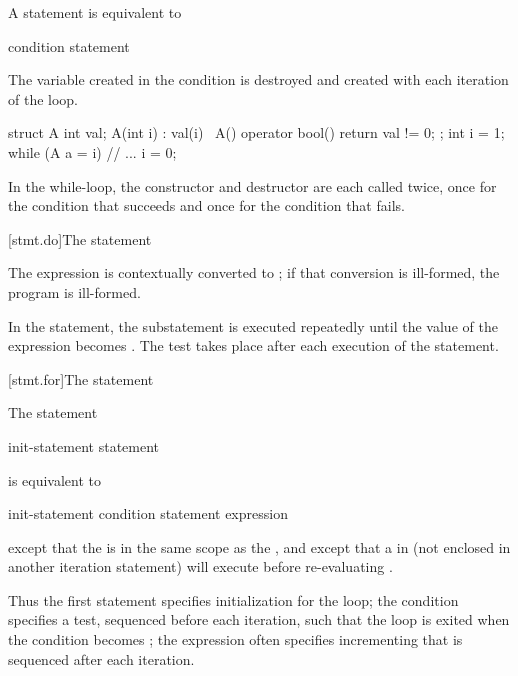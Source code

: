 \pnum
{}%
A  statement is equivalent to
\begin{ncsimplebnf}
 \terminal{:}\br
\terminal{\{}\br
\bnfindent {} \terminal{(} condition \terminal{)} \terminal{\{}\br
\bnfindent \bnfindent statement\br
\bnfindent \bnfindent {}  \terminal{;}\br
\bnfindent \terminal{\}}\br
\terminal{\}}
\end{ncsimplebnf}
\begin{note}
The variable created in the condition is destroyed and created with each
iteration of the loop.
\begin{example}
\begin{codeblock}
struct A {
  int val;
  A(int i) : val(i) { }
  ~A() { }
  operator bool() { return val != 0; }
};
int i = 1;
while (A a = i) {
  // ...
  i = 0;
}
\end{codeblock}
In the while-loop, the constructor and destructor are each called twice,
once for the condition that succeeds and once for the condition that
fails.
\end{example}
\end{note}

[stmt.do]{The  statement}%

\pnum
The expression is contextually converted to ;
if that conversion is ill-formed, the program is ill-formed.

\pnum
In the  statement, the substatement is executed repeatedly
until the value of the expression becomes . The test takes
place after each execution of the statement.

[stmt.for]{The  statement}%

\pnum
The  statement
\begin{ncsimplebnf}
 \terminal{(} init-statement  \terminal{;}  \terminal{)} statement
\end{ncsimplebnf}
is equivalent to
\begin{ncsimplebnf}
\terminal{\{}\br
\bnfindent init-statement\br
\bnfindent {} \terminal{(} condition \terminal{)} \terminal{\{}\br
\bnfindent\bnfindent statement\br
\bnfindent\bnfindent expression \terminal{;}\br
\bnfindent \terminal{\}}\br
\terminal{\}}
\end{ncsimplebnf}
except that the  is
in the same scope as the , and
except that a
%
 in  (not enclosed in another
iteration statement) will execute  before
re-evaluating .
\begin{note}
Thus the first statement specifies initialization for the loop; the
condition specifies a test, sequenced before each
iteration, such that the loop is exited when the condition becomes
; the expression often specifies incrementing that is
sequenced after each iteration.
\end{note}


